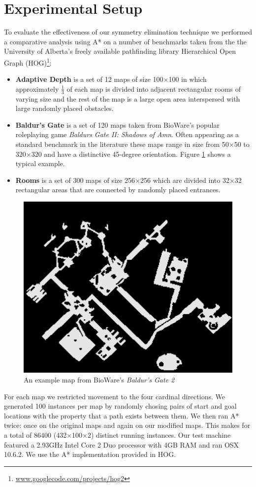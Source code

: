 \section{Experimental Setup}
To evaluate the effectiveness of our symmetry elimination technique we performed
a comparative analysis using A* on a number of benchmarks taken from the
the University of Alberta's freely available pathfinding library 
Hierarchical Open Graph (HOG)\footnote{\url{www.googlecode.com/projects/hog2}}:
\begin{itemize}
\item{\textbf{Adaptive Depth} is a set of 12 maps of size 100$\times$100 in which approximately
$\frac{1}{3}$ of each map is divided into adjacent rectangular rooms of
varying size and the rest of the map is a large open area interspersed with 
large randomly placed obstacles.}
\item{\textbf{Baldur's Gate} is a set of 120 maps taken from BioWare's popular
roleplaying game \emph{Baldurs Gate II: Shadows of Amn}. 
Often appearing as a standard benchmark in the literature 
\cite{botea04,bjornsson05,bjornsson06,sturtevant05,harabor08} these maps range in 
size from 50$\times$50 to 320$\times$320 and have a distinctive 45-degree orientation.
Figure \ref{fig-bgmap} shows a typical example.}
\item{\textbf{Rooms} is a set of 300 maps of size 256$\times$256 which are divided into 32$\times$32
rectangular areas that are connected by randomly placed entrances.}
\end{itemize}

 \begin{figure}[t]
        \begin{center}
                        \includegraphics[width=0.6\columnwidth, trim = 10mm 10mm 10mm 0mm]{diagrams/bgmap.png}
        \end{center}
        \caption{An example map from BioWare's \emph{Baldur's Gate 2}}
        \label{fig-bgmap}
 \end{figure}
\par
For each map we restricted movement to the four cardinal directions.
We generated 100 instances per map by randomly chosing pairs of start and goal locations
with the property that a path exists between them.
We then ran A* twice: once on the original maps and again on our modified maps.
This makes for a total of 86400 (432$\times$100$\times$2) distinct running instances.
Our test machine featured a 2.93GHz Intel Core 2 Duo processor with 4GB RAM and
ran OSX 10.6.2.
We use the A* implementation provided in HOG.
